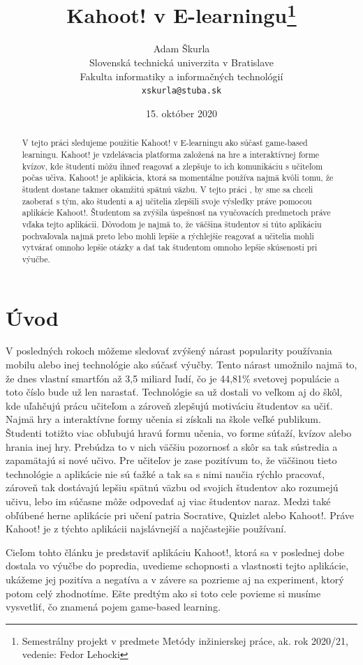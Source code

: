 \documentclass[10pt,oneside,slovak,a4paper]{article}
\title{Kahoot! v E-learningu\thanks{Semestrálny projekt v predmete Metódy inžinierskej práce, ak. rok 2020/21, vedenie: Fedor Lehocki}} %
\author{Adam Škurla\\[2pt]
	{\small Slovenská technická univerzita v Bratislave}\\
	{\small Fakulta informatiky a informačných technológií}\\
	{\small \texttt{xskurla@stuba.sk}}
	}
\date{\small 15. október 2020}
\begin{document}
\maketitle

\begin{abstract}
V tejto práci sledujeme použitie Kahoot! v E-learningu ako súčasť game-based learningu. Kahoot! je vzdelávacia platforma založená na hre a interaktívnej forme kvízov, kde študenti môžu ihneď reagovať a zlepšuje to ich komunikáciu s učiteľom počas učiva. Kahoot! je aplikácia, ktorá sa momentálne používa najmä kvôli tomu, že študent dostane takmer okamžitú spätnú väzbu. V tejto práci , by sme sa chceli zaoberať s tým, ako študenti a aj učitelia zlepšili svoje výsledky práve pomocou aplikácie Kahoot!. Študentom sa zvýšila úspešnosť na vyučovacích predmetoch práve vďaka tejto aplikácii. Dôvodom je najmä to, že väčšina študentov si túto aplikáciu pochvaľovala najmä preto lebo mohli lepšie a rýchlejšie reagovať a učitelia mohli vytvárať omnoho lepšie otázky a dať tak študentom omnoho lepšie skúsenosti pri výučbe.
\end{abstract}



\section*{Úvod}
\label{uvod}
V posledných rokoch môžeme sledovať zvýšený nárast popularity používania mobilu alebo inej technológie ako súčasť výučby. Tento nárast umožnilo najmä to, že dnes  vlastní smartfón až 3,5 miliard ľudí, čo je 44,81\% svetovej populácie\cite{Turner2020} a toto číslo bude už len narastať. Technológie sa už dostali vo veľkom aj do škôl, kde uľahčujú prácu učiteľom a zároveň zlepšujú motiváciu študentov sa učiť. Najmä hry a interaktívne formy učenia si získali na škole veľké publikum. Študenti totižto viac obľubujú hravú formu učenia, vo forme súťaží, kvízov alebo hrania inej hry\cite{WANG2020}. Prebúdza to v nich väčšiu pozornosť a skôr sa tak sústredia a zapamätajú si nové učivo. Pre učiteľov je zase pozitívum to, že väčšinou tieto technológie a aplikácie nie sú ťažké a tak sa s nimi naučia rýchlo pracovať, zároveň tak dostávajú lepšiu spätnú väzbu od svojich študentov ako rozumejú učivu, lebo im súčasne môže odpovedať aj viac študentov naraz. Medzi také obľúbené herne aplikácie pri učení patria Socrative, Quizlet alebo Kahoot!.\cite{Licorish} Práve Kahoot! je z týchto aplikácii najslávnejší a najčastejšie používaní.  

	Cieľom tohto článku je predstaviť aplikáciu Kahoot!, ktorá sa v poslednej dobe dostala vo výučbe do popredia, uvedieme schopnosti a vlastnosti tejto aplikácie, ukážeme jej pozitíva a negatíva a v závere sa pozrieme aj na experiment, ktorý potom celý zhodnotíme. Ešte predtým ako si toto cele povieme si musíme vysvetliť, čo znamená pojem game-based learning.
\end{document}
